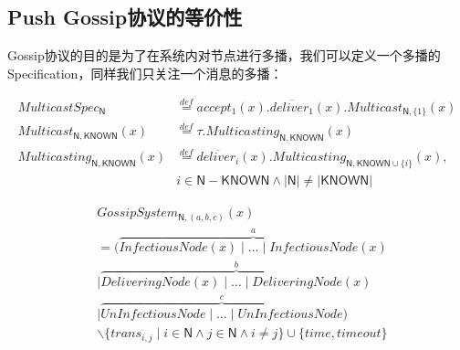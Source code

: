 \subsection{Push Gossip协议的等价性}

Gossip协议的目的是为了在系统内对节点进行多播，我们可以定义一个多播的Specification，同样我们只关注一个消息的多播：
\begin{definition} 
\begin{align*}
    MulticastSpec_\mathsf{N}&\stackrel{def}{=}accept_1(x).\overline{deliver_1}(x).Multicast_{\mathsf{N},\{1\}}(x)\\
    Multicast_{\mathsf{N},\mathsf{KNOWN}}(x)&\stackrel{def}{=}\tau.Multicasting_{\mathsf{N},\mathsf{KNOWN}}(x)\\
    Multicasting_{\mathsf{N},\mathsf{KNOWN}}(x)&\stackrel{def}{=}\overline{deliver_i}(x).Multicasting_{\mathsf{N},\mathsf{KNOWN}\cup\{i\}}(x), \\
    &i\in \mathsf{N}-\mathsf{KNOWN} \wedge |\mathsf{N}|\neq |\mathsf{KNOWN}|
 \end{align*}
\end{definition} 

 \begin{definition} 
    \begin{align*}
   &GossipSystem_{\mathsf{N},(a,b,c)}(x)\\
   &= (\stackrel{a}{\overbrace{InfectiousNode(x)\mid \dots \mid InfectiousNode(x)}}\\
   &\mid \stackrel{b}{\overbrace{DeliveringNode(x)\mid \dots\mid DeliveringNode(x)}}\\
   &\mid \stackrel{c}{\overbrace{UnInfectiousNode\mid \dots \mid UnInfectiousNode}})\\
   &\backslash \{trans_{i,j}\mid i\in \mathsf{N} \wedge j\in \mathsf{N} \wedge i\neq j\}\cup \{time, timeout\}
\end{align*}
 \end{definition} 

